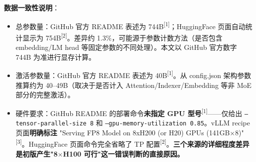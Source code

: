 \documentclass[UTF8,a4paper,10pt,oneside]{ctexart}
\begin{document}
\textbf{数据一致性说明}：
\begin{itemize}
    \item 总参数量：GitHub 官方 README 表述为 744B\textsuperscript{[1]}；HuggingFace 页面自动统计显示为 754B\textsuperscript{[2]}。差异约 1.3\%，可能源于参数计数方法（是否包含 embedding/LM head 等固定参数的不同处理）。本文以 GitHub 官方数字 744B 为准进行显存计算。
    \item 激活参数量：GitHub 官方 README 表述为 40B\textsuperscript{[1]}。从 config.json 架构参数推算约为 40--49B（取决于是否计入 Attention/Indexer/Embedding 等非 MoE 部分的完整激活）。
    \item 硬件要求：GitHub README 的部署命令\textbf{未指定 GPU 型号}\textsuperscript{[1]}——仅给出 \texttt{--tensor-parallel-size 8} 和 \texttt{--gpu-memory-utilization 0.85}。vLLM recipe 页面\textbf{明确标注} "Serving FP8 Model on 8xH200 (or H20) GPUs (141GB$\times$8)"\textsuperscript{[3]}。HuggingFace 页面命令完全省略了 TP 配置\textsuperscript{[2]}。\textbf{三个来源的详细程度差异是初版产生"8$\times$H100 可行"这一错误判断的直接原因。}
\end{itemize}
\end{document}
